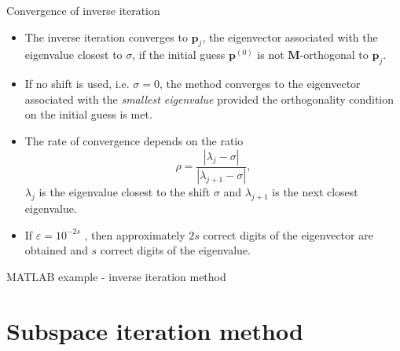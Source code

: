 \documentclass[aspectratio=169]{beamer}
\begin{document}
\begin{frame}{Convergence of inverse iteration}
  \small\vspace{-0.3cm}\begin{tcolorbox}[colback=darkred!10,colframe=darkred!40!black]
    \begin{itemize}
      \item  The inverse iteration converges to $\mathbf p_j$, the eigenvector associated with the eigenvalue closest to \( \sigma \), if the initial guess $\mathbf p^{(0)}$ is not $\mathbf M$-orthogonal to $\mathbf p_j$.
      \item     If no shift is used, i.e. $\sigma=0$, the method converges to the eigenvector associated with the \emph{smallest eigenvalue} provided the orthogonality condition on the initial guess is met.
    \end{itemize}
  \end{tcolorbox}
  \begin{itemize}
    \item The rate of convergence depends on the ratio
          \[
            \rho = \frac{|\lambda_j - \sigma|}{|\lambda_{j+1} - \sigma|},
          \]
          \( \lambda_j \) is the eigenvalue closest to the shift \( \sigma \) and \( \lambda_{j+1} \) is the next closest eigenvalue.
    \item If $\varepsilon=10^{-2s}$ , then approximately \( 2s \) correct digits of the eigenvector are obtained and \( s \) correct digits of the eigenvalue.
  \end{itemize}
\end{frame}

\begin{frame}{MATLAB example - inverse iteration method}
  \begin{center}
    \href{https://drive.mathworks.com/sharing/6a9792ef-d0a7-4aca-a1d0-8b1862b0ac3b}{}
  \end{center}
\end{frame}


\section{Subspace iteration method}
\end{document}
